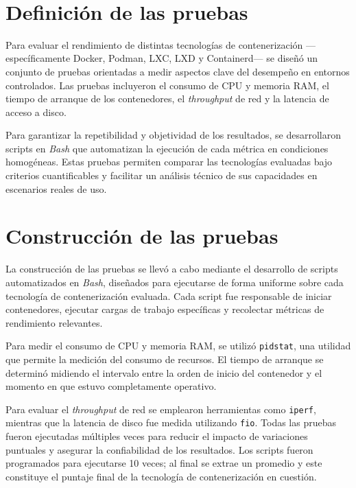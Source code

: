 \label{cap:benchmarking}

\mbox{}\\
\section{Definición de las pruebas}

Para evaluar el rendimiento de distintas tecnologías de contenerización —específicamente Docker, Podman, LXC, LXD y Containerd— se diseñó un conjunto de pruebas orientadas a medir aspectos clave del desempeño en entornos controlados. Las pruebas incluyeron el consumo de CPU y memoria RAM, el tiempo de arranque de los contenedores, el \textit{throughput} de red y la latencia de acceso a disco. 

Para garantizar la repetibilidad y objetividad de los resultados, se desarrollaron scripts en \textit{Bash} que automatizan la ejecución de cada métrica en condiciones homogéneas. Estas pruebas permiten comparar las tecnologías evaluadas bajo criterios cuantificables y facilitar un análisis técnico de sus capacidades en escenarios reales de uso.

\section{Construcción de las pruebas}

La construcción de las pruebas se llevó a cabo mediante el desarrollo de scripts automatizados en \textit{Bash}, diseñados para ejecutarse de forma uniforme sobre cada tecnología de contenerización evaluada. Cada script fue responsable de iniciar contenedores, ejecutar cargas de trabajo específicas y recolectar métricas de rendimiento relevantes.

Para medir el consumo de CPU y memoria RAM, se utilizó \texttt{pidstat}, una utilidad que permite la medición del consumo de recursos. El tiempo de arranque se determinó midiendo el intervalo entre la orden de inicio del contenedor y el momento en que estuvo completamente operativo. 

Para evaluar el \textit{throughput} de red se emplearon herramientas como \texttt{iperf}, mientras que la latencia de disco fue medida utilizando \texttt{fio}. Todas las pruebas fueron ejecutadas múltiples veces para reducir el impacto de variaciones puntuales y asegurar la confiabilidad de los resultados. Los scripts fueron programados para ejecutarse 10 veces; al final se extrae un promedio y este constituye el puntaje final de la tecnología de contenerización en cuestión.

